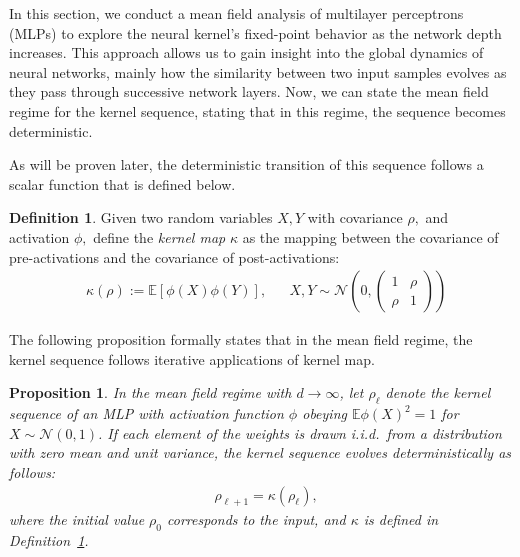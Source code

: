 \documentclass[twoside]{article}
\newcommand{\E}{\mathbb{E}}
\newtheorem{proposition}{Proposition}
\theoremstyle{definition}
\newtheorem{definition}{Definition}
\newcommand{\thomas}[1]{{\color{blue}TH:  \textit{#1}}}
\begin{document}
In this section, we conduct a mean field analysis of multilayer perceptrons (MLPs) to explore the neural kernel's fixed-point behavior as the network depth increases. This approach allows us to gain insight into the global dynamics of neural networks, mainly how the similarity between two input samples evolves as they pass through successive network layers.
Now, we can state the mean field regime for the kernel sequence, stating that in this regime, the sequence becomes deterministic. 

As will be proven later, the deterministic transition of this sequence follows a scalar function that is defined below. 

\begin{definition}
    \label{def:kernel_map}
Given two random variables $X, Y$ with covariance $\rho,$ and activation $\phi,$ define the \emph{kernel map } $\kappa$ as the mapping between the covariance of pre-activations and the covariance of post-activations:
\begin{align}
& \kappa(\rho):=\mathbb{E}[\phi(X)\phi(Y)], && 
 X, Y\sim \mathcal N\left(0, \begin{pmatrix} 1 & \rho \\ \rho & 1 \end{pmatrix}
 \right)
 \label{eq:kernel_map}
\end{align}
\end{definition}

The following proposition formally states that in the mean field regime, the kernel sequence follows iterative applications of kernel map. 

\begin{proposition}
\label{prop:mean_field_kernel_general}
In the mean field regime with $d \to \infty$, let $\rho_\ell$ denote the kernel sequence of an MLP with activation function $\phi$ obeying $\E\phi(X)^2=1$ for $X\sim \mathcal N(0,1)$. If each element of the weights is drawn i.i.d.~from a distribution with zero mean and unit variance, the kernel sequence evolves deterministically as follows:
\begin{align*}
&\rho_{\ell+1} = \kappa(\rho_\ell),
\end{align*}
where the initial value $\rho_0$ corresponds to the input, and $\kappa$ is defined in Definition~\ref{def:kernel_map}. 

\end{proposition}
\end{document}
